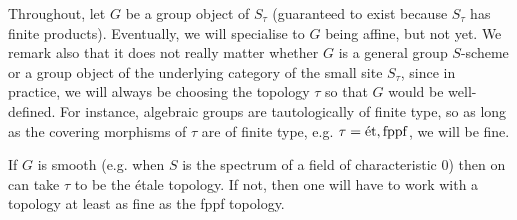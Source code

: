         \begin{convention}
            Throughout, let $G$ be a group object of $S_{\tau}$ (guaranteed to exist because $S_{\tau}$ has finite products). Eventually, we will specialise to $G$ being affine, but not yet. We remark also that it does not really matter whether $G$ is a general group $S$-scheme or a group object of the underlying category of the small site $S_{\tau}$, since in practice, we will always be choosing the topology $\tau$ so that $G$ would be well-defined. For instance, algebraic groups are tautologically of finite type, so as long as the covering morphisms of $\tau$ are of finite type, e.g. $\tau = \mathrm{\acute{e}t}, \mathrm{fppf}$, we will be fine.

        \end{convention}
        \begin{remark}
            If $G$ is smooth (e.g. when $S$ is the spectrum of a field of characteristic $0$) then on can take $\tau$ to be the \'etale topology. If not, then one will have to work with a topology at least as fine as the fppf topology.
        \end{remark}

